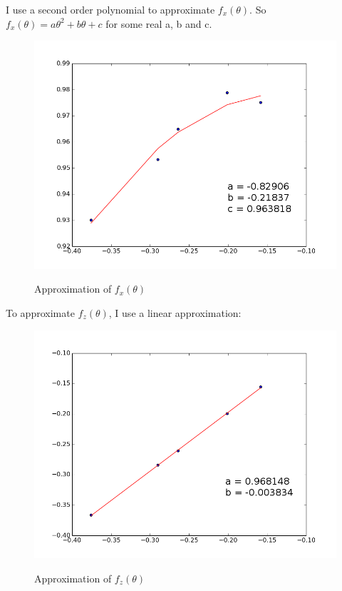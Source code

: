 \documentclass[12pt]{article}
\begin{document}
I use a second order polynomial to approximate $f_x(\theta)$. So $f_x(\theta) = a\theta^2 + b\theta + c$ for some real a, b and c.

\begin{figure}[H]
    \begin{center}
        \includegraphics[scale=0.4]{images/oldmodelX.png} 
        \label{fig:oldmodelX}
        \caption{Approximation of $f_x(\theta)$}
    \end{center}
\end{figure}

To approximate $f_z(\theta)$, I use a linear approximation:
\begin{figure}[H]
    \begin{center}
        \includegraphics[scale=0.4]{images/oldmodelZ.png} 
        \label{fig:oldmodelZ}
        \caption{Approximation of $f_z(\theta)$}
    \end{center}
\end{figure}
\end{document}
